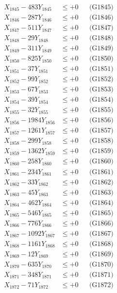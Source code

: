 \documentclass[a4paper,10pt]{article}
\begin{document}
{\begin{align}
X_{1845} - 483Y_{1845} &\leq +0 && \text{(G1845)} \\
X_{1846} - 287Y_{1846} &\leq +0 && \text{(G1846)} \\
X_{1847} - 511Y_{1847} &\leq +0 && \text{(G1847)} \\
X_{1848} - 29Y_{1848} &\leq +0 && \text{(G1848)} \\
X_{1849} - 311Y_{1849} &\leq +0 && \text{(G1849)} \\
X_{1850} - 825Y_{1850} &\leq +0 && \text{(G1850)} \\
\allowbreak
X_{1851} - 37Y_{1851} &\leq +0 && \text{(G1851)} \\
X_{1852} - 99Y_{1852} &\leq +0 && \text{(G1852)} \\
X_{1853} - 67Y_{1853} &\leq +0 && \text{(G1853)} \\
X_{1854} - 39Y_{1854} &\leq +0 && \text{(G1854)} \\
X_{1855} - 32Y_{1855} &\leq +0 && \text{(G1855)} \\
X_{1856} - 1984Y_{1856} &\leq +0 && \text{(G1856)} \\
X_{1857} - 1261Y_{1857} &\leq +0 && \text{(G1857)} \\
X_{1858} - 299Y_{1858} &\leq +0 && \text{(G1858)} \\
X_{1859} - 1362Y_{1859} &\leq +0 && \text{(G1859)} \\
X_{1860} - 258Y_{1860} &\leq +0 && \text{(G1860)} \\
\allowbreak
X_{1861} - 234Y_{1861} &\leq +0 && \text{(G1861)} \\
X_{1862} - 33Y_{1862} &\leq +0 && \text{(G1862)} \\
X_{1863} - 45Y_{1863} &\leq +0 && \text{(G1863)} \\
X_{1864} - 462Y_{1864} &\leq +0 && \text{(G1864)} \\
X_{1865} - 546Y_{1865} &\leq +0 && \text{(G1865)} \\
X_{1866} - 776Y_{1866} &\leq +0 && \text{(G1866)} \\
X_{1867} - 1092Y_{1867} &\leq +0 && \text{(G1867)} \\
X_{1868} - 1161Y_{1868} &\leq +0 && \text{(G1868)} \\
X_{1869} - 12Y_{1869} &\leq +0 && \text{(G1869)} \\
X_{1870} - 635Y_{1870} &\leq +0 && \text{(G1870)} \\
\allowbreak
X_{1871} - 348Y_{1871} &\leq +0 && \text{(G1871)} \\
X_{1872} - 71Y_{1872} &\leq +0 && \text{(G1872)} \\

\end{align}}
\end{document}
